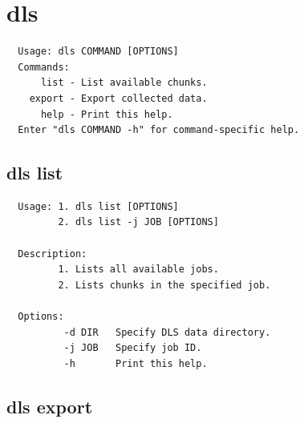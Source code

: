 \documentclass[a4paper,12pt,BCOR6mm,bibtotoc,idxtotoc]{scrbook}
\begin{document}

\section{dls}
\label{sec:apx_cmd_dls}

\begin{lstlisting}
  Usage: dls COMMAND [OPTIONS]
  Commands:
      list - List available chunks.
    export - Export collected data.
      help - Print this help.
  Enter "dls COMMAND -h" for command-specific help.
\end{lstlisting}


\subsection{dls list}

\begin{lstlisting}
  Usage: 1. dls list [OPTIONS]
         2. dls list -j JOB [OPTIONS]

  Description:
         1. Lists all available jobs.
         2. Lists chunks in the specified job.

  Options:
          -d DIR   Specify DLS data directory.
          -j JOB   Specify job ID.
          -h       Print this help.
\end{lstlisting}


\subsection{dls export}
\end{document}
